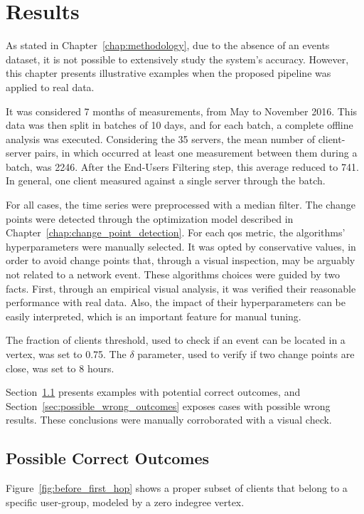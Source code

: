 \chapter{Results}
\label{chap:results}

As stated in Chapter~\ref{chap:methodology}, due to the absence of an events
dataset, it is not possible to extensively study the system's accuracy.
However, this chapter presents illustrative examples when the proposed pipeline
was applied to real data.

It was considered 7 months of measurements, from May to November 2016.
This data was then split in batches of 10 days, and for each batch,
a complete offline analysis was executed.
Considering the 35 servers, the mean number of client-server
pairs, in which occurred at least one measurement between them during a batch,
was 2246.
After the End-Users Filtering step, this average reduced to 741.
In general, one client measured against a single server through the batch.

For all cases, the time series were preprocessed with a median filter.
The change points were detected through the optimization model described in
Chapter~\ref{chap:change_point_detection}.
For each \gls*{qos} metric, the algorithms' hyperparameters were manually selected.
It was opted by conservative values, in order to avoid change points that,
through a visual inspection, may be arguably not related to a network event.
These algorithms choices were guided by two facts.
First, through an empirical visual analysis,
it was verified their reasonable performance with real data.
Also, the impact of their hyperparameters can be easily interpreted, which is
an important feature for manual tuning.

The fraction of clients threshold, used to check if an event can be
located in a vertex, was set to 0.75. The $\delta$ parameter, used to verify if
two change points are close, was set to 8 hours.

Section~\ref{sec:possible_correct_outcomes} presents examples with potential
correct outcomes, and Section~\ref{sec:possible_wrong_outcomes} exposes
cases with possible wrong results. These conclusions were manually corroborated
with a visual check.

\section{Possible Correct Outcomes}
\label{sec:possible_correct_outcomes}

Figure~\ref{fig:before_first_hop} shows a proper subset of clients that belong
to a specific user-group, modeled by a zero indegree vertex.

